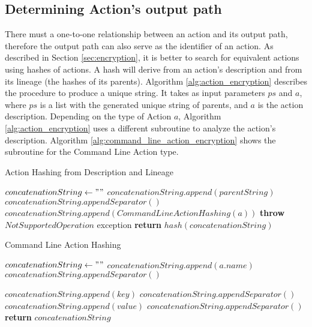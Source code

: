\subsection{Determining Action's output path}
There must a one-to-one relationship between an action and its output path, therefore the output path can also serve as the identifier of an action. As described in Section \ref{sec:encryption}, it is better to search for equivalent actions using hashes of actions. A hash will derive from an action's description and from its lineage (the hashes of its parents). Algorithm \ref{alg:action_encryption} describes the procedure to produce a unique string.  It takes as input parameters $ps$ and $a$, where $ps$ is a list with the generated unique string of parents, and $a$ is the action description.  Depending on the type of Action $a$, Algorithm \ref{alg:action_encryption} uses a different subroutine to analyze the action's description. Algorithm \ref{alg:command_line_action_encryption} shows the subroutine for the Command Line Action type.

\begin{algorithm}
\begin{singlespace}
\caption{Action Hashing from Description and Lineage}
\label{alg:action_encryption}
\begin{algorithmic}[1]
\State $concatenationString \gets ""$
	\State $concatenationString.append(parentString)$
	\State $concatenationString.appendSeparator()$
\EndFor
{}
	\State $concatenationString.append(CommandLineActionHashing(a))$
\Else
	\State \textbf{throw} $NotSupportedOperation$ exception
\EndIf
\State \textbf{return} $hash(concatenationString)$

\EndProcedure
\end{algorithmic}
\end{singlespace}
\end{algorithm}

\begin{algorithm}
\begin{singlespace}
\caption{Command Line Action Hashing}
\label{alg:command_line_action_encryption}
\begin{algorithmic}[1]
\State $concatenationString \gets " "$
\State $concatenationString.append(a.name)$
\State $concatenationString.appendSeparator()$

	\State $concatenationString.append(key)$
	\State $concatenationString.appendSeparator()$
	\State $concatenationString.append(value)$
	\State $concatenationString.appendSeparator()$
\EndFor
	\State \textbf{return} $concatenationString$
\EndProcedure
\end{algorithmic}
\end{singlespace}
\end{algorithm}

